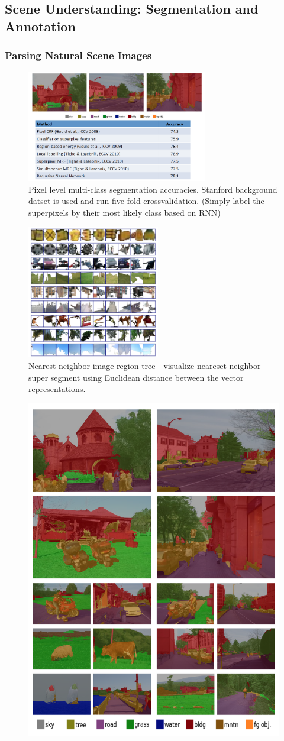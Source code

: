 \documentclass{beamer}
\begin{document}
\subsection{Scene Understanding: Segmentation and Annotation}
\frame
{
  \frametitle{Parsing Natural Scene Images}
  \begin{figure}[ht]  
  	\begin{center}
  		\includegraphics[width=3.1in]{images/ex5.png}   
		\caption{Pixel level multi-class segmentation accuracies. Stanford background datset is used and run five-fold crossvalidation. (Simply label the superpixels by their most likely class based on RNN)}
	\end{center}
  \end{figure}
}
\frame
{
  \begin{figure}[ht]  
  	\begin{center}
  		\includegraphics[height=2.3in]{images/ex2.png}   
		\caption{Nearest neighbor image region tree - visualize neareset neighbor super segment using Euclidean distance between the vector representations.}
	\end{center}
  \end{figure}
}
\frame
{
  \begin{figure}[ht]  
  	\begin{center}
  		\includegraphics[height=3.in]{images/ex1.png}   
	\end{center}
  \end{figure}
}
\end{document}
